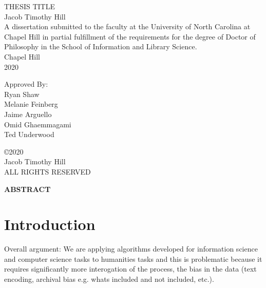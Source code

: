 \documentclass[12pt, oneside]{report}
\begin{document}
	\thispagestyle{empty}

	\begin{center}
		\singlespacing
		\vspace{4in}
		THESIS TITLE\\
		\vspace{1in}
		Jacob Timothy Hill\\
		\vspace{1in}
		A dissertation submitted to the faculty at the University of North Carolina at Chapel Hill in partial fulfillment of the requirements for the degree of Doctor of Philosophy in the School of Information and Library Science.\\
		\vspace{1in}
		Chapel Hill\\
		2020
		\vspace{1in}
	\end{center}	
	\begin{raggedleft}
		Approved By:\\
		Ryan Shaw\\
		Melanie Feinberg\\
		Jaime Arguello\\
		Omid Ghaemmagami\\
		Ted Underwood\\
	\end{raggedleft}
\newpage
\begin{center}
	\vspace*{\fill}
	\copyright 2020\\
	Jacob Timothy Hill\\
	ALL RIGHTS RESERVED
	\vspace{1in}
\end{center}
\begin{center}
	\textbf{ABSTRACT}
\end{center}
\setlength{\parindent}{15pt}
\tableofcontents
\newpage
\listoffigures
\chapter{Introduction}
Overall argument: We are applying algorithms developed for information science and computer science tasks to humanities tasks and this is problematic because it requires significantly more interogation of the process, the bias in the data (text encoding, archival bias e.g. whats included and not included, etc.).
\end{document}
